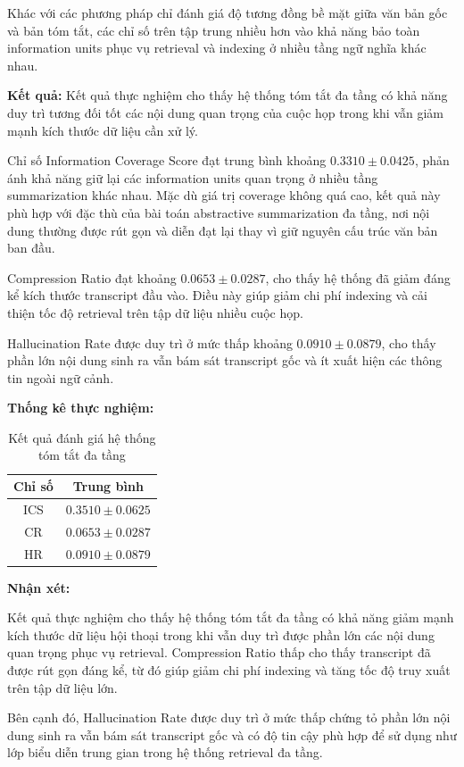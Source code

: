 Khác với các phương pháp chỉ đánh giá độ tương đồng bề mặt giữa văn bản gốc và bản tóm tắt, các chỉ số trên tập trung nhiều hơn vào khả năng bảo toàn information units phục vụ retrieval và indexing ở nhiều tầng ngữ nghĩa khác nhau.

\textbf{Kết quả:}
Kết quả thực nghiệm cho thấy hệ thống tóm tắt đa tầng có khả năng duy trì tương đối tốt các nội dung quan trọng của cuộc họp trong khi vẫn giảm mạnh kích thước dữ liệu cần xử lý.

Chỉ số Information Coverage Score đạt trung bình khoảng $\mathbf{0.3310 \pm 0.0425}$, phản ánh khả năng giữ lại các information units quan trọng ở nhiều tầng summarization khác nhau. Mặc dù giá trị coverage không quá cao, kết quả này phù hợp với đặc thù của bài toán abstractive summarization đa tầng, nơi nội dung thường được rút gọn và diễn đạt lại thay vì giữ nguyên cấu trúc văn bản ban đầu.

Compression Ratio đạt khoảng $\mathbf{0.0653 \pm 0.0287}$, cho thấy hệ thống đã giảm đáng kể kích thước transcript đầu vào. Điều này giúp giảm chi phí indexing và cải thiện tốc độ retrieval trên tập dữ liệu nhiều cuộc họp.

Hallucination Rate được duy trì ở mức thấp khoảng $\mathbf{0.0910 \pm 0.0879}$, cho thấy phần lớn nội dung sinh ra vẫn bám sát transcript gốc và ít xuất hiện các thông tin ngoài ngữ cảnh.

\textbf{Thống kê thực nghiệm:}

\begin{table}[H]
\centering
\begin{tabular}{|c|c|}
\hline
\textbf{Chỉ số} & \textbf{Trung bình} \\
\hline
ICS & $0.3510 \pm 0.0625$ \\
\hline
CR & $0.0653 \pm 0.0287$ \\
\hline
HR & $0.0910 \pm 0.0879$ \\
\hline
\end{tabular}
\caption{Kết quả đánh giá hệ thống tóm tắt đa tầng}
\end{table}

\textbf{Nhận xét:}

Kết quả thực nghiệm cho thấy hệ thống tóm tắt đa tầng có khả năng giảm mạnh kích thước dữ liệu hội thoại trong khi vẫn duy trì được phần lớn các nội dung quan trọng phục vụ retrieval. Compression Ratio thấp cho thấy transcript đã được rút gọn đáng kể, từ đó giúp giảm chi phí indexing và tăng tốc độ truy xuất trên tập dữ liệu lớn.

Bên cạnh đó, Hallucination Rate được duy trì ở mức thấp chứng tỏ phần lớn nội dung sinh ra vẫn bám sát transcript gốc và có độ tin cậy phù hợp để sử dụng như lớp biểu diễn trung gian trong hệ thống retrieval đa tầng.

